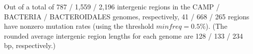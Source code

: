 Out of a total of 787 / 1,559 / 2,196 intergenic regions in the CAMP / BACTERIA / BACTEROIDALES genomes, respectively, 41 / 668 / 265 regions have nonzero mutation rates (using the threshold $minfreq=0.5\%$). (The rounded average intergenic region lengths for each genome are 128 / 133 / 234 bp, respectively.)\endinput